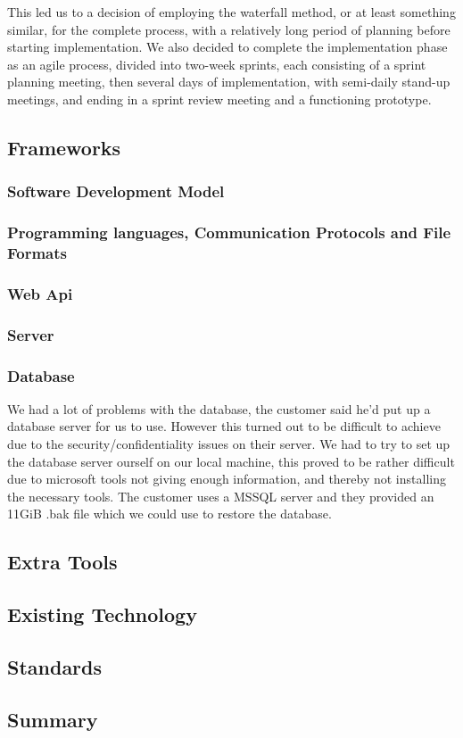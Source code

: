 This led us to a decision of employing the waterfall method, or at least something similar, for the complete process, with a relatively long period of planning before starting implementation. We also decided to complete the implementation phase as an agile process, divided into two-week sprints, each consisting of a sprint planning meeting, then several days of implementation, with semi-daily stand-up meetings, and ending in a sprint review meeting and a functioning prototype.
\subsection{Frameworks}
\subsubsection{Software Development Model}
\subsubsection{Programming languages, Communication Protocols and File Formats}
\subsubsection{Web Api}
\subsubsection{Server}
\subsubsection{Database}
We had a lot of problems with the database, the customer said he'd put up a database server for us to use. However this turned out to be difficult to achieve due to the security/confidentiality issues on their server. We had to try to set up the database server ourself on our local machine, this proved to be rather difficult due to microsoft tools not giving enough information, and thereby not installing the necessary tools.     
The customer uses a MSSQL server and they provided an 11GiB .bak file which we could use to restore the database.
\subsection{Extra Tools}
\subsection{Existing Technology}

\subsection{Standards}

\subsection{Summary}